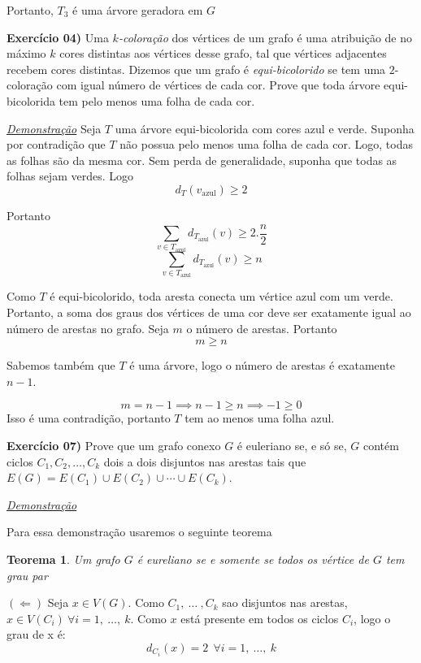 \documentclass[12pt, a4paper]{article}
\newtheorem{theorem}{Teorema}
\begin{document}
  Portanto, $T_3$ é uma árvore geradora em $G$
  \newpage

\textbf{Exercício 04)} Uma \textit{$k$-coloração} dos vértices de um grafo é uma atribuição de no máximo $k$
  cores distintas aos vértices desse grafo, tal que vértices adjacentes recebem
  cores distintas. Dizemos que um grafo é \textit{equi-bicolorido} se tem uma
  $2$-coloração com igual número de vértices de cada cor.
  Prove que toda árvore equi-bicolorida tem pelo menos uma folha de cada cor.

  \vspace{0.5cm}
  \textit{\underline{Demonstração}}
  Seja $T$ uma árvore equi-bicolorida com cores azul e verde. Suponha
  por contradição que $T$ não possua pelo menos uma folha de cada cor.
  Logo, todas as folhas são da mesma cor. Sem perda de generalidade, suponha
  que todas as folhas sejam verdes. Logo 
  $$d_T(v_{\text{azul}}) \ge 2$$

  Portanto
  $$\sum_{v \in T_{\text{azul}}}d_{T_{\text{azul}}}(v) \ge 2 .\frac{n}{2}$$
  $$\sum_{v \in T_{\text{azul}}}d_{T_{\text{azul}}}(v) \ge n$$

  Como $T$ é equi-bicolorido, toda aresta conecta um vértice azul com um verde.
  Portanto, a soma dos graus dos vértices de uma cor deve ser exatamente igual
  ao número de arestas no grafo. Seja $m$ o número de arestas. Portanto
  $$m \ge n$$

  Sabemos também que $T$ é uma árvore, logo o número de arestas é exatamente
  $n-1$.

  $$m=n-1 \implies n-1 \ge n \implies -1 \ge 0$$
  Isso é uma contradição, portanto $T$ tem ao menos uma folha azul.
  \newpage

\textbf{Exercício 07)} Prove que um grafo conexo $G$ é euleriano se, e só se, $G$ contém ciclos
  $C_{1},C_{2},\ldots,C_{k}$ dois a dois disjuntos nas arestas tais que $E(G) =
  E(C_{1}) \cup E(C_{2}) \cup \cdots \cup E(C_{k})$.

  \vspace{0.5cm}
  \textit{\underline{Demonstração}}

  Para essa demonstração usaremos o seguinte teorema

  \begin{theorem}
    Um grafo $G$ é eureliano se e somente se todos os vértice de $G$ tem
    grau par
  \end{theorem}

  $(\Leftarrow)$ Seja $x \in V(G)$. Como $C_1,\ \hdots \ , C_k$ sao disjuntos
  nas arestas, $x \in V(C_i) \ \forall i = 1,\ \hdots,\ k$. Como $x$ está
  presente em todos os ciclos $C_i$, logo o grau de x é:
  $$d_{C_i}(x) = 2\ \ \forall i = 1,\ \hdots,\ k$$
\end{document}
